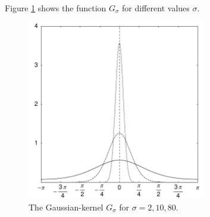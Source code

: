 \documentclass[11pt,a4paper,twoside,bibtotoc]{scrartcl}
\theoremstyle{plain}
\theoremstyle{definition}
\theoremstyle{remark}
\numberwithin{equation}{section}
\numberwithin{table}{section}
\numberwithin{figure}{section}
\begin{document}
Figure \ref{Basics:Figure:GKernel} shows the function $G_{\sigma}$ for
different values $\sigma$.
\begin{figure}[tb]
  \centering
  \includegraphics[width=0.7\textwidth]{images/gaussian}
  \caption{The Gaussian-kernel $G_{\sigma}$ for $\sigma = 2,10,80$.}
  \label{Basics:Figure:GKernel}
\end{figure}
\end{document}
